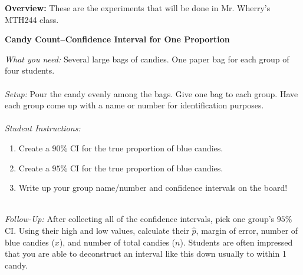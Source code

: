 \documentclass[12pt]{amsart}
\theoremstyle{definition}
\begin{document}
 \textbf{Overview:} These are the experiments that will be done in Mr. Wherry's MTH244 class.\\
 \begin{framed}
\begin{center} \textbf{Candy Count--Confidence Interval for One Proportion} \end{center}
\emph{What you need:} Several large bags of candies. One paper bag for each group of four students.\\
~\\
\emph{Setup:} Pour the candy evenly among the bags. Give one bag to each group. Have each group come up with a name or number for identification purposes.\\
~\\
\emph{Student Instructions:}
 \begin{enumerate}
 \item Create a $90\%$ CI for the true proportion of blue candies.
 \item Create a $95\%$ CI for the true proportion of blue candies.
 \item Write up your group name/number and confidence intervals on the board!
 \end{enumerate}
 ~\\
 \emph{Follow-Up:} After collecting all of the confidence intervals, pick one group's $95\%$ CI. Using their high and low values, calculate their $\hat{p}$, margin of error, number of blue candies ($x$), and number of total candies ($n$). Students are often impressed that you are able to deconstruct an interval like this down usually to within 1 candy.
 \end{framed}
 \newpage
\end{document}
